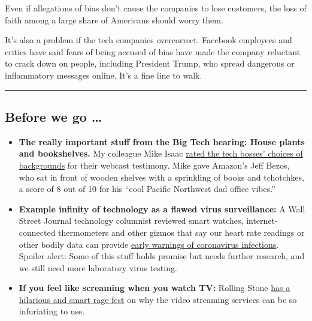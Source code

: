 Even if allegations of bias don't cause the companies to lose customers,
the loss of faith among a large share of Americans should worry them.

It's also a problem if the tech companies overcorrect. Facebook
employees and critics have said fears of being accused of bias have made
the company reluctant to crack down on people, including President
Trump, who spread dangerous or inflammatory messages online. It's a fine
line to walk.

\begin{center}\rule{0.5\linewidth}{\linethickness}\end{center}

\hypertarget{before-we-go-}{%
\subsection{Before we go \ldots{}}\label{before-we-go-}}

\begin{itemize}
\item
  \textbf{The really important stuff from the Big Tech hearing: House
  plants and bookshelves.} My colleague Mike Isaac
  \href{https://www.nytimes3xbfgragh.onion/live/2020/07/29/technology/tech-ceos-hearing-testimony/tech-executives-looked-like-they-work-in-well-tech-offices}{rated
  the tech bosses' choices of backgrounds} for their webcast testimony.
  Mike gave Amazon's Jeff Bezos, who sat in front of wooden shelves with
  a sprinkling of books and tchotchkes, a score of 8 out of 10 for his
  ``cool Pacific Northwest dad office vibes.''
\item
  \textbf{Example infinity of technology as a flawed virus
  surveillance:} A Wall Street Journal technology columnist reviewed
  smart watches, internet-connected thermometers and other gizmos that
  say our heart rate readings or other bodily data can provide
  \href{https://www.wsj.com/articles/could-you-have-covid-19-soon-your-smartwatch-or-smart-ring-might-tell-you-11595949072}{early
  warnings of coronavirus infections}. Spoiler alert: Some of this stuff
  holds promise but needs further research, and we still need more
  laboratory virus testing.
\item
  \textbf{If you feel like screaming when you watch TV:} Rolling Stone
  \href{https://www.rollingstone.com/tv/tv-features/streaming-wars-user-experience-sepinwall-1031729/}{has
  a hilarious and smart rage fest} on why the video streaming services
  can be so infuriating to use.
\end{itemize}

